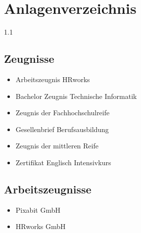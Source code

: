 \documentclass[12pt,parskip=half-]{scrartcl}
\begin{document}
\ifdefined\NurLebenslauf\else
\fi %


\section{Anlagenverzeichnis}

\begin{spacing}{1.1}
   

    \subsection{Zeugnisse}
    \begin{itemize}
    	\item Arbeitszeugnis HRworks
        \item Bachelor Zeugnis Technische Informatik
        \item Zeugnis der Fachhochschulreife
        \item Gesellenbrief Berufsausbildung
        \item Zeugnis der mittleren Reife
        \item Zertifikat Englisch Intensivkurs
    \end{itemize}
\Abstand
 \subsection{Arbeitszeugnisse}
\begin{itemize}
	\item Pixabit GmbH
	\item HRworks GmbH
\end{itemize}

\end{spacing}
\clearpage


 


 
 
 
 
 
 
 



\fi %
\end{document}
